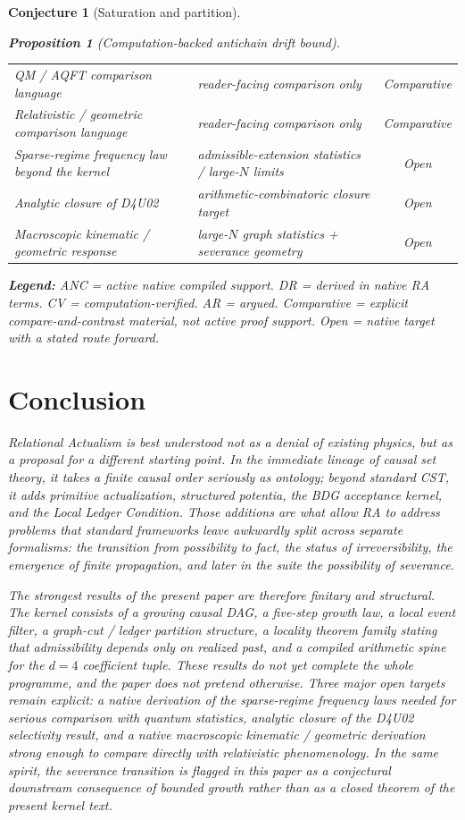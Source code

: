 \documentclass[11pt]{article}
\newtheorem{proposition}{Proposition}
\newtheorem{conjecture}{Conjecture}
\begin{document}
\begin{conjecture}[Saturation and partition]
\begin{proposition}[Computation-backed antichain drift bound]
\begin{center}
\begin{tabular}{llc}
QM / AQFT comparison language & reader-facing comparison only & Comparative \\
Relativistic / geometric comparison language & reader-facing comparison only & Comparative \\
Sparse-regime frequency law beyond the kernel & admissible-extension statistics / large-$N$ limits & Open \\
Analytic closure of D4U02 & arithmetic-combinatoric closure target & Open \\
Macroscopic kinematic / geometric response & large-$N$ graph statistics + severance geometry & Open \\
\bottomrule
\end{tabular}
\end{center}

\textbf{Legend:} ANC = active native compiled support. DR = derived in native RA terms. CV = computation-verified. AR = argued. Comparative = explicit compare-and-contrast material, not active proof support. Open = native target with a stated route forward.

\section{Conclusion}
\label{sec:conclusion}

Relational Actualism is best understood not as a denial of existing physics, but as a proposal for a different starting point. In the immediate lineage of causal set theory, it takes a finite causal order seriously as ontology; beyond standard CST, it adds primitive actualization, structured potentia, the BDG acceptance kernel, and the Local Ledger Condition. Those additions are what allow RA to address problems that standard frameworks leave awkwardly split across separate formalisms: the transition from possibility to fact, the status of irreversibility, the emergence of finite propagation, and later in the suite the possibility of severance.

The strongest results of the present paper are therefore finitary and structural. The kernel consists of a growing causal DAG, a five-step growth law, a local event filter, a graph-cut / ledger partition structure, a locality theorem family stating that admissibility depends only on realized past, and a compiled arithmetic spine for the $d=4$ coefficient tuple. These results do not yet complete the whole programme, and the paper does not pretend otherwise. Three major open targets remain explicit: a native derivation of the sparse-regime frequency laws needed for serious comparison with quantum statistics, analytic closure of the D4U02 selectivity result, and a native macroscopic kinematic / geometric derivation strong enough to compare directly with relativistic phenomenology. In the same spirit, the severance transition is flagged in this paper as a conjectural downstream consequence of bounded growth rather than as a closed theorem of the present kernel text.


\end{proposition}
\end{conjecture}
\end{document}
